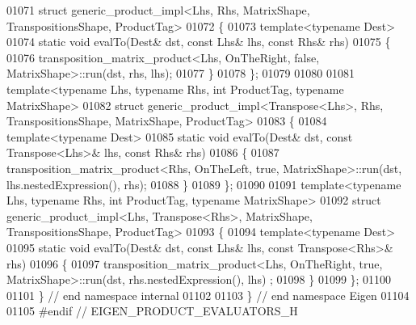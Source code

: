 \begin{DoxyCode}
01071 \textcolor{keyword}{struct }generic\_product\_impl<Lhs, Rhs, MatrixShape, TranspositionsShape, ProductTag>
01072 \{
01073   \textcolor{keyword}{template}<\textcolor{keyword}{typename} Dest>
01074   \textcolor{keyword}{static} \textcolor{keywordtype}{void} evalTo(Dest& dst, \textcolor{keyword}{const} Lhs& lhs, \textcolor{keyword}{const} Rhs& rhs)
01075   \{
01076     transposition\_matrix\_product<Lhs, OnTheRight, false, MatrixShape>::run(dst, rhs, lhs);
01077   \}
01078 \};
01079 
01080 
01081 \textcolor{keyword}{template}<\textcolor{keyword}{typename} Lhs, \textcolor{keyword}{typename} Rhs, \textcolor{keywordtype}{int} ProductTag, \textcolor{keyword}{typename} MatrixShape>
01082 \textcolor{keyword}{struct }generic\_product\_impl<Transpose<Lhs>, Rhs, TranspositionsShape, MatrixShape, ProductTag>
01083 \{
01084   \textcolor{keyword}{template}<\textcolor{keyword}{typename} Dest>
01085   \textcolor{keyword}{static} \textcolor{keywordtype}{void} evalTo(Dest& dst, \textcolor{keyword}{const} Transpose<Lhs>& lhs, \textcolor{keyword}{const} Rhs& rhs)
01086   \{
01087     transposition\_matrix\_product<Rhs, OnTheLeft, true, MatrixShape>::run(dst, lhs.nestedExpression(), rhs);
01088   \}
01089 \};
01090 
01091 \textcolor{keyword}{template}<\textcolor{keyword}{typename} Lhs, \textcolor{keyword}{typename} Rhs, \textcolor{keywordtype}{int} ProductTag, \textcolor{keyword}{typename} MatrixShape>
01092 \textcolor{keyword}{struct }generic\_product\_impl<Lhs, Transpose<Rhs>, MatrixShape, TranspositionsShape, ProductTag>
01093 \{
01094   \textcolor{keyword}{template}<\textcolor{keyword}{typename} Dest>
01095   \textcolor{keyword}{static} \textcolor{keywordtype}{void} evalTo(Dest& dst, \textcolor{keyword}{const} Lhs& lhs, \textcolor{keyword}{const} Transpose<Rhs>& rhs)
01096   \{
01097     transposition\_matrix\_product<Lhs, OnTheRight, true, MatrixShape>::run(dst, rhs.nestedExpression(), lhs)
      ;
01098   \}
01099 \};
01100 
01101 \} \textcolor{comment}{// end namespace internal}
01102 
01103 \} \textcolor{comment}{// end namespace Eigen}
01104 
01105 \textcolor{preprocessor}{#endif // EIGEN\_PRODUCT\_EVALUATORS\_H}
\end{DoxyCode}
